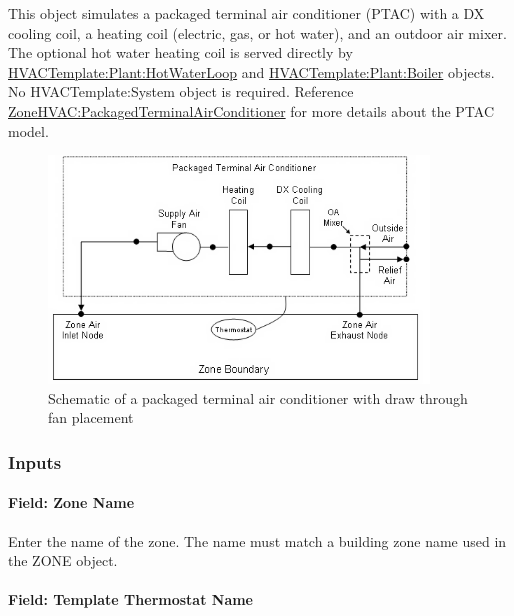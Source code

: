 This object simulates a packaged terminal air conditioner (PTAC) with a DX cooling coil, a heating coil (electric, gas, or hot water), and an outdoor air mixer. The optional hot water heating coil is served directly by \hyperref[hvactemplateplanthotwaterloop]{HVACTemplate:Plant:HotWaterLoop} and \hyperref[hvactemplateplantboiler]{HVACTemplate:Plant:Boiler} objects. No HVACTemplate:System object is required. Reference \hyperref[zonehvacpackagedterminalairconditioner]{ZoneHVAC:PackagedTerminalAirConditioner} for more details about the PTAC model.

\begin{figure}[hbtp] %
\centering
\includegraphics[width=0.9\textwidth, height=0.9\textheight, keepaspectratio=true]{media/image603.png}
\caption{Schematic of a packaged terminal air conditioner with draw through fan placement \protect \label{fig:schematic-of-a-packaged-terminal-air}}
\end{figure}

\subsubsection{Inputs}\label{inputs-4-016}

\paragraph{Field: Zone Name}\label{field-zone-name-3-001}

Enter the name of the zone. The name must match a building zone name used in the ZONE object.

\paragraph{Field: Template Thermostat Name}\label{field-template-thermostat-name-3}

